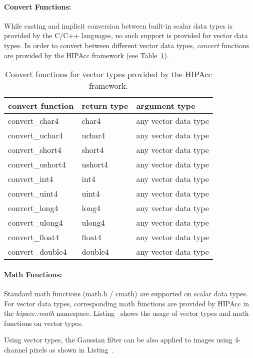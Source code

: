 \paragraph{Convert Functions:}
While casting and implicit conversion between built-in scalar data types is
provided by the C/C++ languages, no such support is provided for vector data
types. In order to convert between different vector data types, {\em convert}
functions are provided by the \ac{HIPAcc} framework (see
Table~\ref{tab:convert}).

\begin{table}
    \centering
    \begin{tabular}{lll}
\hline
convert function \qquad & return type \qquad & argument type \\
\hline
convert\_char4      & char4     & any vector data type \\
convert\_uchar4     & uchar4    & any vector data type \\
convert\_short4     & short4    & any vector data type \\
convert\_ushort4    & ushort4   & any vector data type \\
convert\_int4       & int4      & any vector data type \\
convert\_uint4      & uint4     & any vector data type \\
convert\_long4      & long4     & any vector data type \\
convert\_ulong4     & ulong4    & any vector data type \\
convert\_float4     & float4    & any vector data type \\
convert\_double4    & double4   & any vector data type \\
\hline
    \end{tabular}
    \caption{Convert functions for vector types provided by the \ac{HIPAcc}
    framework.}\label{tab:convert}
\end{table}


\paragraph{Math Functions:}
Standard math functions (math.h / cmath) are supported on scalar data types. For
vector data types, corresponding math functions are provided by \ac{HIPAcc} in
the {\em hipacc::math} namespace. Listing~ shows
the usage of vector types and math functions on vector types.


Using vector types, the Gaussian filter can be also applied to images using
4-channel pixels as shown in Listing~.


